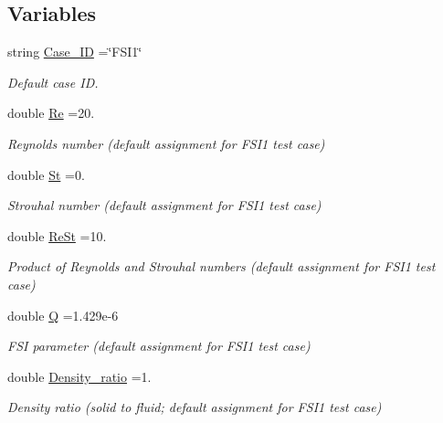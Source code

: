 \subsection*{Variables}
\begin{DoxyCompactItemize}
\item 
string \hyperlink{namespaceGlobal__Parameters_a887474a9be53363806b4de417f660dba}{Case\+\_\+\+ID} =\char`\"{}F\+S\+I1\char`\"{}
\begin{DoxyCompactList}\small\item\em Default case ID. \end{DoxyCompactList}\item 
double \hyperlink{namespaceGlobal__Parameters_a9d72e94a9305c6a310940a6a427ebe06}{Re} =20.
\begin{DoxyCompactList}\small\item\em Reynolds number (default assignment for F\+S\+I1 test case) \end{DoxyCompactList}\item 
double \hyperlink{namespaceGlobal__Parameters_af1af40a0df651e86bc1be273fafa98da}{St} =0.
\begin{DoxyCompactList}\small\item\em Strouhal number (default assignment for F\+S\+I1 test case) \end{DoxyCompactList}\item 
double \hyperlink{namespaceGlobal__Parameters_a7a59a32365e87566069e458dc83bd18a}{Re\+St} =10.
\begin{DoxyCompactList}\small\item\em Product of Reynolds and Strouhal numbers (default assignment for F\+S\+I1 test case) \end{DoxyCompactList}\item 
double \hyperlink{namespaceGlobal__Parameters_a7814fddf663e56168174a42d2cd6b4c1}{Q} =1.\+429e-\/6
\begin{DoxyCompactList}\small\item\em F\+SI parameter (default assignment for F\+S\+I1 test case) \end{DoxyCompactList}\item 
double \hyperlink{namespaceGlobal__Parameters_a517d4c31b8bce6563c2f605266dd9679}{Density\+\_\+ratio} =1.
\begin{DoxyCompactList}\small\item\em Density ratio (solid to fluid; default assignment for F\+S\+I1 test case) \end{DoxyCompactList}\item 

\end{DoxyCompactItemize}

